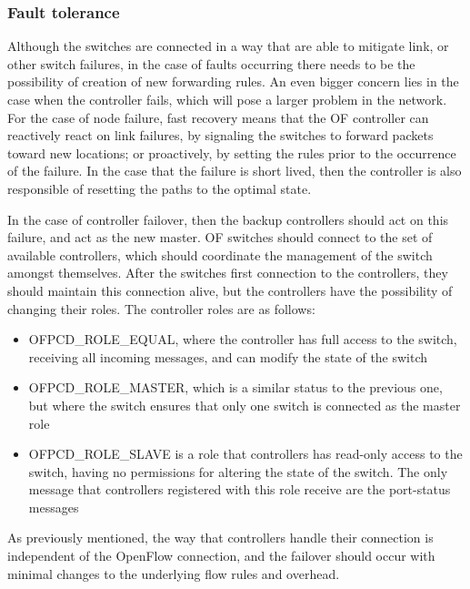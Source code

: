 \subsubsection {Fault tolerance} \label{sec:fault_tolerance}

Although the switches are connected in a way that are able to mitigate link, or other switch failures, in the case of faults occurring there needs to be the possibility of creation of new forwarding rules. An even bigger 
concern lies in the case when the controller fails, which will pose a larger problem in the network. For the case of node failure, fast recovery means that the OF controller can reactively react on link failures, by signaling the
switches to forward packets toward new locations; or proactively, by setting the rules prior to the occurrence of the failure. In the case that the failure is short lived, then the controller is also responsible of resetting the 
paths to the optimal state.
\par In the case of controller failover, then the backup controllers should act on this failure, and act as the new master. OF switches should connect to the set of available controllers, which should coordinate the management of 
the switch amongst themselves. After the switches first connection to the controllers, they should maintain this connection alive, but the controllers have the possibility of changing their roles. The controller roles are as follows:

\begin {itemize}
    \item \textsc {OFPCD\_ROLE\_EQUAL}, where the controller has full access to the switch, receiving all incoming messages, and can modify the state of the switch
    \item \textsc {OFPCD\_ROLE\_MASTER}, which is a similar status to the previous one, but where the switch ensures that only one switch is connected as the master role
    \item \textsc {OFPCD\_ROLE\_SLAVE} is a role that controllers has read-only access to the switch, having no permissions for altering the state of the switch. The only message that controllers registered with this role receive
        are the port-status messages
\end {itemize}

As previously mentioned, the way that controllers handle their connection is independent of the OpenFlow connection, and the failover should occur with minimal changes to the underlying flow rules and overhead.

